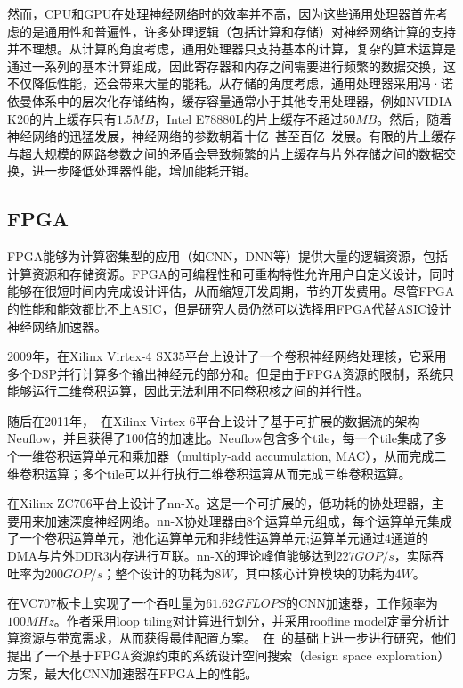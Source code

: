 然而，CPU和GPU在处理神经网络时的效率并不高，因为这些通用处理器首先考虑的是通用性和普遍性，许多处理逻辑（包括计算和存储）对神经网络计算的支持并不理想。从计算的角度考虑，通用处理器只支持基本的计算，复杂的算术运算是通过一系列的基本计算组成，因此寄存器和内存之间需要进行频繁的数据交换，这不仅降低性能，还会带来大量的能耗。从存储的角度考虑，通用处理器采用冯·诺依曼体系中的层次化存储结构，缓存容量通常小于其他专用处理器，例如NVIDIA K20的片上缓存只有$1.5MB$，Intel E78880L的片上缓存不超过$50MB$。然后，随着神经网络的迅猛发展，神经网络的参数朝着十亿~\cite{le2013building}甚至百亿~\cite{coates2013deep}发展。有限的片上缓存与超大规模的网路参数之间的矛盾会导致频繁的片上缓存与片外存储之间的数据交换，进一步降低处理器性能，增加能耗开销。

\subsection{FPGA}
FPGA能够为计算密集型的应用（如CNN，DNN等）提供大量的逻辑资源，包括计算资源和存储资源。FPGA的可编程性和可重构特性允许用户自定义设计，同时能够在很短时间内完成设计评估，从而缩短开发周期，节约开发费用。尽管FPGA的性能和能效都比不上ASIC，但是研究人员仍然可以选择用FPGA代替ASIC设计神经网络加速器。

2009年，\citet{farabet2009cnp}在Xilinx Virtex-4 SX35平台上设计了一个卷积神经网络处理核，它采用多个DSP并行计算多个输出神经元的部分和。但是由于FPGA资源的限制，系统只能够运行二维卷积运算，因此无法利用不同卷积核之间的并行性。

随后在2011年，~\citet{farabet2011neuflow}在Xilinx Virtex 6平台上设计了基于可扩展的数据流的架构Neuflow，并且获得了100倍的加速比。Neuflow包含多个tile，每一个tile集成了多个一维卷积运算单元和乘加器（multiply-add accumulation, MAC），从而完成二维卷积运算；多个tile可以并行执行二维卷积运算从而完成三维卷积运算。

\citet{gokhale2014240}在Xilinx ZC706平台上设计了nn-X。这是一个可扩展的，低功耗的协处理器，主要用来加速深度神经网络。nn-X协处理器由8个运算单元组成，每个运算单元集成了一个卷积运算单元，池化运算单元和非线性运算单元;运算单元通过4通道的DMA与片外DDR3内存进行互联。nn-X的理论峰值能够达到$227GOP/s$，实际吞吐率为$200GOP/s$；整个设计的功耗为$8W$，其中核心计算模块的功耗为$4W$。

\citet{zhang2015optimizing}在VC707板卡上实现了一个吞吐量为$61.62GFLOPS$的CNN加速器，工作频率为$100MHz$。作者采用loop tiling对计算进行划分，并采用roofline model定量分析计算资源与带宽需求，从而获得最佳配置方案。~\citet{suda2016throughput}在~\citet{zhang2015optimizing}的基础上进一步进行研究，他们提出了一个基于FPGA资源约束的系统设计空间搜索（design space exploration）方案，最大化CNN加速器在FPGA上的性能。

